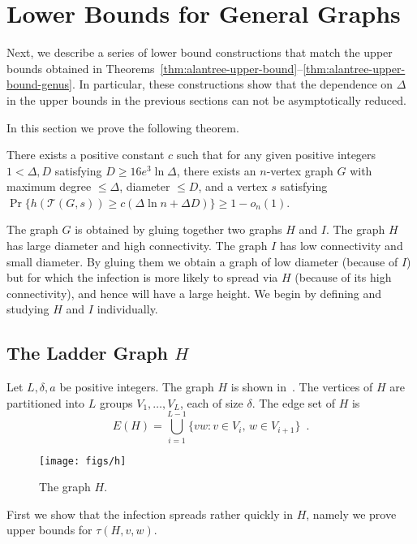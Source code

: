 \documentclass{patmorin}
\newcommand{\tcal}{\mathcal{T}}
\begin{document}
\section{Lower Bounds for General Graphs}

Next, we describe a series of lower bound
constructions that match the upper bounds obtained in
Theorems~\ref{thm:alantree-upper-bound}--\ref{thm:alantree-upper-bound-genus}.
In particular, these constructions show that the dependence on $\Delta$
in the upper bounds in the previous sections can not be asymptotically
reduced.

In this section we prove the following theorem.

\begin{thm}
There exists a positive constant $c$ such that 
for any given positive integers $1<\Delta, D$ satisfying
$D\geq 16e^3 \ln \Delta$,
there exists an $n$-vertex graph $G$ with 
maximum degree $\leq \Delta$,
diameter $\leq D$, and
a vertex $s$ satisfying
$\Pr\{h(\tcal(G,s)) \geq c(\Delta \ln n + \Delta D)\}\geq 1-o_n(1)$.
\end{thm}


The graph $G$ is obtained by gluing together two graphs $H$ and $I$.
The graph $H$ has large diameter and high connectivity.  The graph $I$
has low connectivity and small diameter.  By gluing them we obtain a graph
of low diameter (because of $I$) but for which the infection is more likely to spread via $H$ (because of its high connectivity), and hence will have a large height.  We begin by
defining and studying $H$ and $I$ individually.


\subsection{The Ladder Graph $H$}

Let $L,\delta,a$ be positive integers.
The graph $H$ is shown in~.  The vertices of $H$ are partitioned into $L$ groups
$V_1,\ldots,V_L$, each of size $\delta$. The edge set of $H$ is
\[
   E(H) = \bigcup_{i=1}^{L-1} \{vw : v\in V_{i},\, w\in V_{i+1}\} \enspace .
\]
\begin{figure}
  \begin{center}
    \texttt{[image: figs/h]} 
  \end{center}
  \caption{The graph $H$.}
\end{figure}

First we show that the infection spreads rather quickly in $H$, namely we prove upper bounds for $\tau(H,v,w)$.
\end{document}
